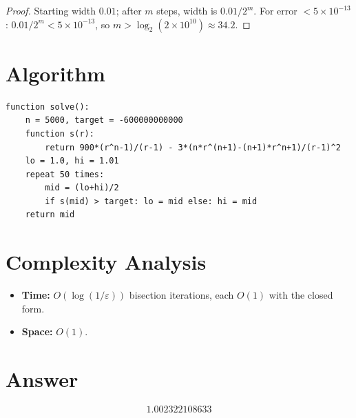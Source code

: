 \documentclass[12pt]{article}
\begin{document}
\begin{proof}
Starting width $0.01$; after $m$ steps, width is $0.01/2^m$. For error $< 5\times 10^{-13}$: $0.01/2^m < 5\times 10^{-13}$, so $m > \log_2(2\times 10^{10}) \approx 34.2$.
\end{proof}

\section{Algorithm}

\begin{verbatim}
function solve():
    n = 5000, target = -600000000000
    function s(r):
        return 900*(r^n-1)/(r-1) - 3*(n*r^(n+1)-(n+1)*r^n+1)/(r-1)^2
    lo = 1.0, hi = 1.01
    repeat 50 times:
        mid = (lo+hi)/2
        if s(mid) > target: lo = mid else: hi = mid
    return mid
\end{verbatim}

\section{Complexity Analysis}
\begin{itemize}
    \item \textbf{Time:} $O(\log(1/\varepsilon))$ bisection iterations, each $O(1)$ with the closed form.
    \item \textbf{Space:} $O(1)$.
\end{itemize}

\section{Answer}

\[
\boxed{1.002322108633}
\]
\end{document}
